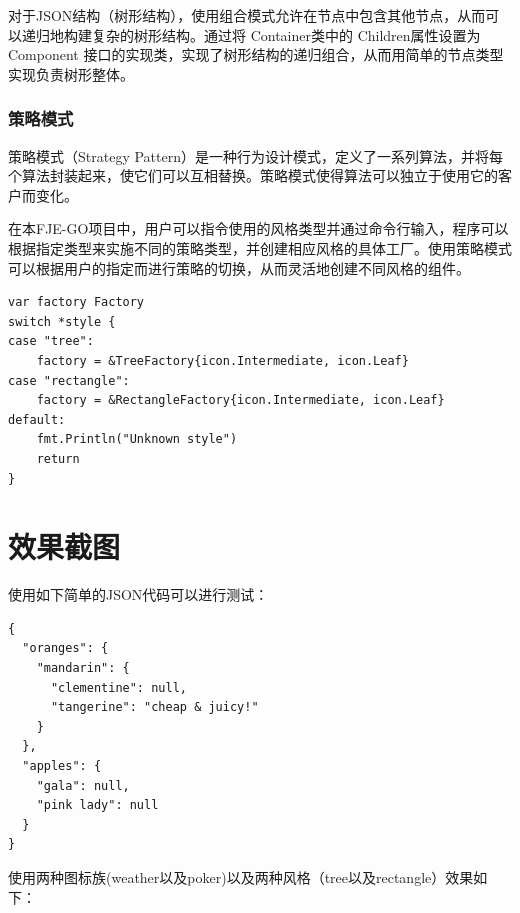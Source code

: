 \documentclass[hyperref,a4paper,UTF8]{ctexart}
\begin{document}
对于JSON结构（树形结构），使用组合模式允许在节点中包含其他节点，从而可以递归地构建复杂的树形结构。通过将 Container类中的 Children属性设置为 Component 接口的实现类，实现了树形结构的递归组合，从而用简单的节点类型实现负责树形整体。


\subsubsection{策略模式}
策略模式（Strategy Pattern）是一种行为设计模式，定义了一系列算法，并将每个算法封装起来，使它们可以互相替换。策略模式使得算法可以独立于使用它的客户而变化。

在本FJE-GO项目中，用户可以指令使用的风格类型并通过命令行输入，程序可以根据指定类型来实施不同的策略类型，并创建相应风格的具体工厂。使用策略模式可以根据用户的指定而进行策略的切换，从而灵活地创建不同风格的组件。
\begin{lstlisting}
var factory Factory
switch *style {
case "tree":
    factory = &TreeFactory{icon.Intermediate, icon.Leaf}
case "rectangle":
    factory = &RectangleFactory{icon.Intermediate, icon.Leaf}
default:
    fmt.Println("Unknown style")
    return
}

\end{lstlisting}


























\section{效果截图}

使用如下简单的JSON代码可以进行测试：

\begin{lstlisting}
{
  "oranges": {
    "mandarin": {
      "clementine": null,
      "tangerine": "cheap & juicy!"
    }
  },
  "apples": {
    "gala": null,
    "pink lady": null
  }
}
\end{lstlisting}

使用两种图标族(weather以及poker)以及两种风格（tree以及rectangle）效果如下：
\end{document}
